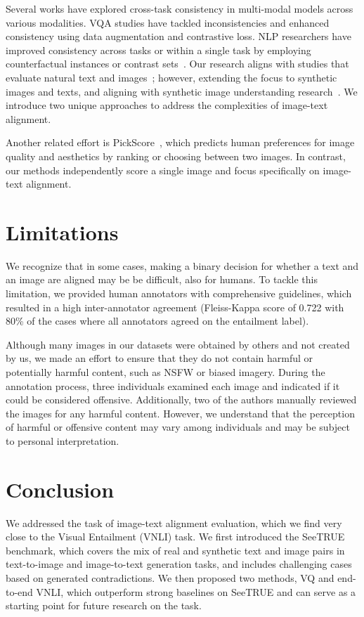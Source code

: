 \documentclass{article}
\newcommand{\datasetname}[0]{SeeTRUE\xspace}
\newcommand{\VQSQR}[0]{VQ\xspace}
\begin{document}
Several works have explored cross-task consistency in multi-modal models across various modalities. VQA studies have tackled inconsistencies and enhanced consistency using data augmentation and contrastive loss. NLP researchers have improved consistency across tasks or within a single task by employing counterfactual instances or contrast sets~\citep{dagan2010recognizing,SNLI}. Our research aligns with studies that evaluate natural text and images~\citep{maharana2023exposing}; however, extending the focus to synthetic images and texts, and aligning with synthetic image understanding research~\citep{gokhale2022benchmarking, li2022dall, bitton2023breaking, wu2023better, borji2022generated, stockl2022evaluating}. We introduce two unique approaches to address the complexities of image-text alignment.

Another related effort is PickScore~\cite{kirstain2023pickapic}, which predicts human preferences for image quality and aesthetics by ranking or choosing between two images. In contrast, our methods independently score a single image and focus specifically on image-text alignment.  




\section{Limitations}
\label{sec:limitations}
We recognize that in some cases, making a binary decision for whether a text and an image are aligned may be be difficult, also for humans. To tackle this limitation, we provided human annotators with comprehensive guidelines, which resulted in a high inter-annotator agreement (Fleiss-Kappa score of 0.722 with 80\% of the cases where all annotators agreed on the entailment label). 

Although many images in our datasets were obtained by others and not created by us, we made an effort to ensure that they do not contain harmful or potentially harmful content, such as NSFW or biased imagery. During the annotation process, three individuals examined each image and indicated if it could be considered offensive. Additionally, two of the authors manually reviewed the images for any harmful content. However, we understand that the perception of harmful or offensive content may vary among individuals and may be subject to personal interpretation. 
\section{Conclusion}
\label{sec:conclusion}
We addressed the task of image-text alignment evaluation, which we find very close to the Visual Entailment (VNLI) task. We first introduced the \datasetname benchmark, which covers the mix of real and synthetic text and image pairs in text-to-image and image-to-text generation tasks, and includes challenging cases based on generated contradictions. We then proposed two methods, \VQSQR and end-to-end VNLI, which outperform strong baselines on \datasetname and can serve as a starting point for future research on the task.
\end{document}
